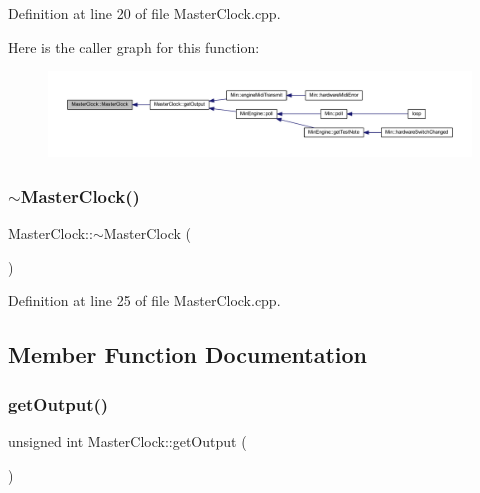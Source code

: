 Definition at line 20 of file Master\+Clock.\+cpp.

Here is the caller graph for this function\+:
\nopagebreak
\begin{figure}[H]
\begin{center}
\leavevmode
\includegraphics[width=350pt]{class_master_clock_a479dec94c2b2061cca4fd9ce6a8b207a_icgraph}
\end{center}
\end{figure}
\mbox{\label{class_master_clock_aa7ff1a5f175a32f2a1d1b05a9c5ecf53}} 
\subsubsection{\texorpdfstring{$\sim$\+Master\+Clock()}{~MasterClock()}}
{\footnotesize\ttfamily Master\+Clock\+::$\sim$\+Master\+Clock (\begin{DoxyParamCaption}{ }\end{DoxyParamCaption})}



Definition at line 25 of file Master\+Clock.\+cpp.



\subsection{Member Function Documentation}
\mbox{\label{class_master_clock_af63318129f4c13824614e73f549e5894}} 
\subsubsection{\texorpdfstring{get\+Output()}{getOutput()}}
{\footnotesize\ttfamily unsigned int Master\+Clock\+::get\+Output (\begin{DoxyParamCaption}{ }\end{DoxyParamCaption})\hspace{0.3cm}{\ttfamily [inline]}}



